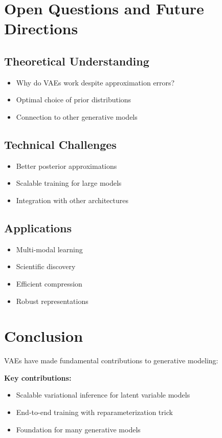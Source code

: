 \section{Open Questions and Future Directions}

\subsection{Theoretical Understanding}

\begin{itemize}
    \item Why do VAEs work despite approximation errors?
    \item Optimal choice of prior distributions
    \item Connection to other generative models
\end{itemize}

\subsection{Technical Challenges}

\begin{itemize}
    \item Better posterior approximations
    \item Scalable training for large models
    \item Integration with other architectures
\end{itemize}

\subsection{Applications}

\begin{itemize}
    \item Multi-modal learning
    \item Scientific discovery
    \item Efficient compression
    \item Robust representations
\end{itemize}

\section{Conclusion}

VAEs have made fundamental contributions to generative modeling:

\textbf{Key contributions:}
\begin{itemize}
    \item Scalable variational inference for latent variable models
    \item End-to-end training with reparameterization trick
    \item Foundation for many generative models
\end{itemize}

